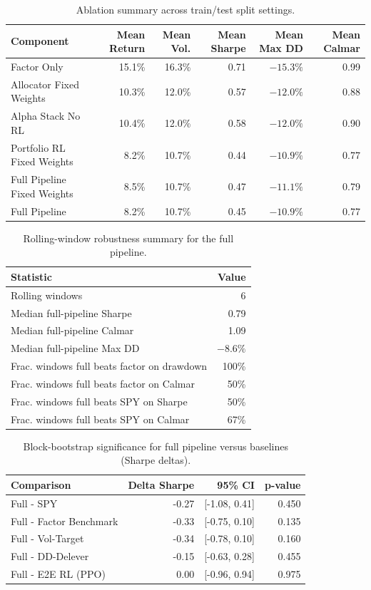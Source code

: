 \begin{table}[H]
\centering
\caption{Ablation summary across train/test split settings.}
\label{tab:ablation_summary}
\begin{tabular}{@{} l r r r r r @{}}
\toprule
Component & Mean Return & Mean Vol. & Mean Sharpe & Mean Max DD & Mean Calmar \\
\midrule
Factor Only & 15.1\% & 16.3\% & 0.71 & $-15.3\%$ & 0.99 \\
Allocator Fixed Weights & 10.3\% & 12.0\% & 0.57 & $-12.0\%$ & 0.88 \\
Alpha Stack No RL & 10.4\% & 12.0\% & 0.58 & $-12.0\%$ & 0.90 \\
Portfolio RL Fixed Weights & 8.2\% & 10.7\% & 0.44 & $-10.9\%$ & 0.77 \\
Full Pipeline Fixed Weights & 8.5\% & 10.7\% & 0.47 & $-11.1\%$ & 0.79 \\
Full Pipeline & 8.2\% & 10.7\% & 0.45 & $-10.9\%$ & 0.77 \\
\bottomrule
\end{tabular}
\end{table}

\begin{table}[H]
\centering
\caption{Rolling-window robustness summary for the full pipeline.}
\label{tab:robustness_summary}
\begin{tabular}{@{} l r @{}}
\toprule
Statistic & Value \\
\midrule
Rolling windows & 6 \\
Median full-pipeline Sharpe & 0.79 \\
Median full-pipeline Calmar & 1.09 \\
Median full-pipeline Max DD & $-8.6\%$ \\
Frac. windows full beats factor on drawdown & 100\% \\
Frac. windows full beats factor on Calmar & 50\% \\
Frac. windows full beats SPY on Sharpe & 50\% \\
Frac. windows full beats SPY on Calmar & 67\% \\
\bottomrule
\end{tabular}
\end{table}

\begin{table}[H]
\centering
\caption{Block-bootstrap significance for full pipeline versus baselines (Sharpe deltas).}
\label{tab:bootstrap_significance}
\begin{tabular}{@{} l r r r @{}}
\toprule
Comparison & Delta Sharpe & 95\% CI & p-value \\
\midrule
Full - SPY & -0.27 & [-1.08, 0.41] & 0.450 \\
Full - Factor Benchmark & -0.33 & [-0.75, 0.10] & 0.135 \\
Full - Vol-Target & -0.34 & [-0.78, 0.10] & 0.160 \\
Full - DD-Delever & -0.15 & [-0.63, 0.28] & 0.455 \\
Full - E2E RL (PPO) & 0.00 & [-0.96, 0.94] & 0.975 \\
\bottomrule
\end{tabular}
\end{table}
